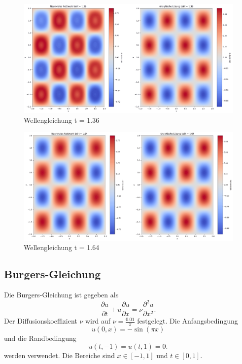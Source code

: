 \begin{figure}
    \centering
    \includegraphics[width=\textwidth]{papers/neuronal/images/prediction_wave_t136.png}
    \caption{Wellengleichung t = 1.36}
    \label{fig:wellen_t136}
\end{figure}
\begin{figure}
    \centering
    \includegraphics[width=\textwidth]{papers/neuronal/images/prediction_wave_t164.png}
    \caption{Wellengleichung t = 1.64}
    \label{fig:wellen_t164}
\end{figure}

\subsection{Burgers-Gleichung}\label{neuronal:subsection:burgers_gleichung}
Die Burgers-Gleichung ist gegeben als
\begin{equation}
    \frac{\partial u}{\partial t} + u \frac{\partial u}{\partial x} = \nu \frac{\partial^2 u}{\partial x^2}.
    \label{neuronal:burgers}
\end{equation}
Der Diffusionskoeffizient \( \nu \) wird auf \( \nu = \frac{0.01}{\pi} \) festgelegt.
Die Anfangsbedingung
\begin{equation}
    u(0, x) = - \sin(\pi x)
    \label{neuronal:burgers_anfang}
\end{equation}
und die Randbedingung
\begin{equation}
    u(t, -1) = u(t, 1) = 0.
    \label{neuronal:burgers_rand}
\end{equation}
werden verwendet.
Die Bereiche sind \( x \in [-1,1] \) und \( t \in [0,1] \).

